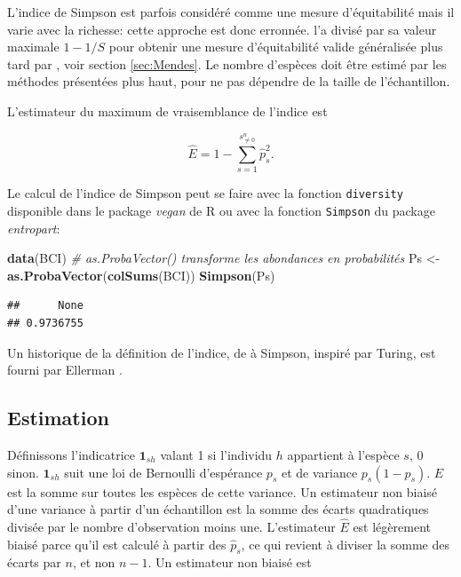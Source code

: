 \documentclass[
  11pt,
  french,
  a4paper,
  extrafontsizes,onecolumn,openright
  ]{memoir}
\newenvironment{Shaded}{\begin{snugshade}}{\end{snugshade}}
\newcommand{\CommentTok}[1]{\textcolor[rgb]{0.56,0.35,0.01}{\textit{#1}}}
\newcommand{\KeywordTok}[1]{\textcolor[rgb]{0.13,0.29,0.53}{\textbf{#1}}}
\newcommand{\NormalTok}[1]{#1}
\newcommand{\StringTok}[1]{\textcolor[rgb]{0.31,0.60,0.02}{#1}}
\newlength{\rf}
\begin{document}
L'indice de Simpson est parfois considéré comme une mesure d'équitabilité \autocite{Olszewski2004} mais il varie avec la richesse: cette approche est donc erronnée.
\textcite{Hurlbert1971} l'a divisé par sa valeur maximale \(1-{1}/{S}\) pour obtenir une mesure d'équitabilité valide généralisée plus tard par \textcite{Mendes2008}, voir section \ref{sec:Mendes}.
Le nombre d'espèces doit être estimé par les méthodes présentées plus haut, pour ne pas dépendre de la taille de l'échantillon.

L'estimateur du maximum de vraisemblance de l'indice est

\begin{equation}
  \label{eq:EstEML}
  \hat{E} = 1-\sum^{s^{n}_{\ne 0}}_{s=1}{\hat{p}^2_s}.
\end{equation}

Le calcul de l'indice de Simpson peut se faire avec la fonction \texttt{diversity} disponible dans le package \emph{vegan} de R ou avec la fonction \texttt{Simpson} du package \emph{entropart}:

\scriptsize

\begin{Shaded}
\begin{Highlighting}[]
\KeywordTok{data}\NormalTok{(BCI)}
\CommentTok{# as.ProbaVector() transforme les abondances en probabilités}
\NormalTok{Ps <-}\StringTok{ }\KeywordTok{as.ProbaVector}\NormalTok{(}\KeywordTok{colSums}\NormalTok{(BCI))}
\KeywordTok{Simpson}\NormalTok{(Ps)}
\end{Highlighting}
\end{Shaded}

\begin{verbatim}
##      None 
## 0.9736755
\end{verbatim}

\normalsize

Un historique de la définition de l'indice, de \textcite{Gini1912} à Simpson, inspiré par Turing, est fourni par Ellerman \autocite*{Ellerman2013}.

\hypertarget{estimation}{%
\subsection{Estimation}\label{estimation}}

Définissons l'indicatrice \({{\mathbf 1}}_{sh}\) valant 1 si l'individu \(h\) appartient à l'espèce \(s\), 0 sinon.
\({{\mathbf 1}}_{sh}\) suit une loi de Bernoulli d'espérance \(p_s\) et de variance \(p_s\left(1-p_s\right)\).
\(E\) est la somme sur toutes les espèces de cette variance.
Un estimateur non biaisé d'une variance à partir d'un échantillon est la somme des écarts quadratiques divisée par le nombre d'observation moins une.
L'estimateur \(\hat{E}\) est légèrement biaisé parce qu'il est calculé à partir des \({\hat{p}}_s\), ce qui revient à diviser la somme des écarts par \(n\), et non \(n-1\).
Un estimateur non biaisé est \autocite{Good1953,Lande1996}
\end{document}
